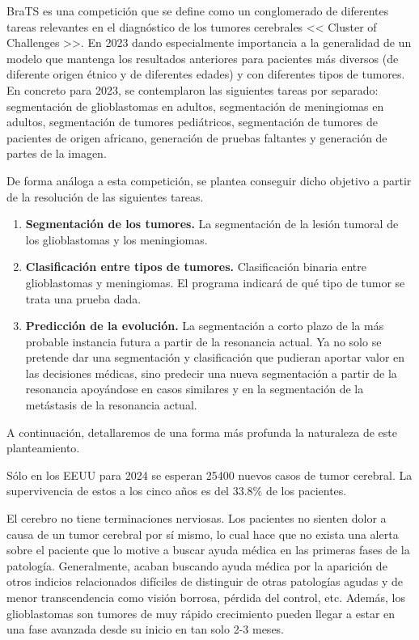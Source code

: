 BraTS es una competición que se define como un conglomerado de diferentes tareas relevantes en el diagnóstico de los tumores cerebrales << Cluster of Challenges >>. En 2023 dando especialmente importancia a la generalidad de un modelo que mantenga los resultados anteriores para pacientes más diversos (de diferente origen étnico y de diferentes edades) y con diferentes tipos de tumores. En concreto para 2023, se contemplaron las siguientes tareas por separado: segmentación de glioblastomas en adultos, segmentación de meningiomas en adultos, segmentación de tumores pediátricos, segmentación de tumores de pacientes de origen africano, generación de pruebas faltantes y generación de partes de la imagen.

De forma análoga a esta competición, se plantea conseguir dicho objetivo a partir de la resolución de las siguientes tareas.

\begin{enumerate}
	\item \textbf{Segmentación de los tumores.} 
	La segmentación de la lesión tumoral de los glioblastomas y los meningiomas.
	\item \textbf{Clasificación entre tipos de tumores.} Clasificación binaria entre glioblastomas y meningiomas. El programa indicará de qué tipo de tumor se trata una prueba dada.
	\item \textbf{Predicción de la evolución.} La segmentación a corto plazo de la más probable instancia futura a partir de la resonancia actual. Ya no solo se pretende dar una segmentación y clasificación que pudieran aportar valor en las decisiones médicas, sino predecir una nueva segmentación a partir de la resonancia apoyándose en casos similares y en la segmentación de la metástasis de la resonancia actual.
\end{enumerate}

A continuación, detallaremos de una forma más profunda la naturaleza de este planteamiento.

Sólo en los EEUU para 2024 se esperan 25400 nuevos casos de tumor cerebral. La supervivencia de estos a los cinco años es del $33.8 \%$ de los pacientes. \cite{cancerorg}

El cerebro no tiene terminaciones nerviosas. Los pacientes no sienten dolor a causa de un tumor cerebral por sí mismo, lo cual hace que no exista una alerta sobre el paciente que lo motive a buscar ayuda médica en las primeras fases de la patología. Generalmente, acaban buscando ayuda médica por la aparición de otros indicios relacionados difíciles de distinguir de otras patologías agudas y de menor transcendencia como visión borrosa, pérdida del control, etc. Además, los glioblastomas son tumores de muy rápido crecimiento pueden llegar a estar en una fase avanzada desde su inicio en tan solo 2-3 meses.

